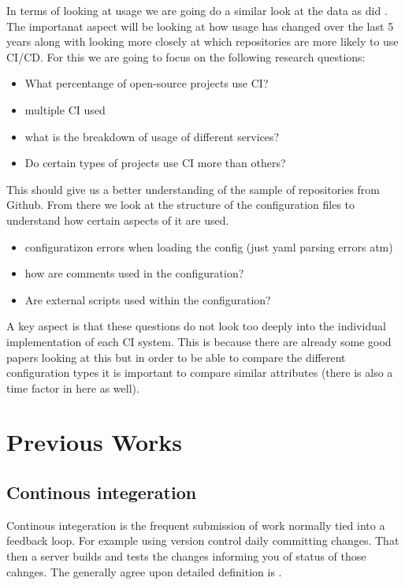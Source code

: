 \documentclass[twoside,12pt,titlepage,a4paper]{article}
\begin{document}
In terms of looking at usage we are going do a similar look at the data as did \cite{Hilton2016}. The importanat aspect will be looking at how usage has changed over the last 5 years along with looking more closely at which repositories are more likely to use CI/CD. For this we are going to focus on the following research questions:
\begin{itemize}
  \item What percentange of open-source projects use CI?
  \item multiple CI used
  \item what is the breakdown of usage of different services?
  \item Do certain types of projects use CI more than others?
\end{itemize}

This should give us a better understanding of the sample of repositories from Github. From there we look at the structure of the configuration files to understand how certain aspects of it are used.
\begin{itemize}
  \item configuratizon errors when loading the config (just yaml parsing errors atm)
  \item how are comments used in the configuration?
  \item Are external scripts used within the configuration?
\end{itemize}

A key aspect is that these questions do not look too deeply into the individual implementation of each CI system. This is because there are already some good papers looking \cite{Gallaba2018} at this but in order to be able to compare the different configuration types it is important to compare similar attributes (there is also a time factor in here as well). 

\section{Previous Works}
\vspace*{-0.05in}
\subsection{Continous integeration}
\vspace*{-0.05in}

Continous integeration is the frequent submission of work normally tied into a feedback loop. For example using version control daily committing changes. That then a server builds and tests the changes informing you of status of those cahnges. The generally agree upon detailed definition is \cite{CI2010_MartinFowler}.
\end{document}
